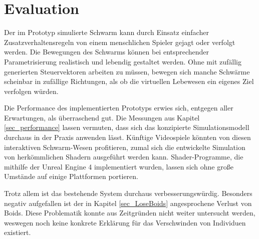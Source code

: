 \documentclass[a4paper, 10pt, journal]{wissarbIEEE}      %
\begin{document}
\section{Evaluation}



Der im Prototyp simulierte Schwarm kann durch Einsatz einfacher Zusatzverhaltensregeln von einem menschlichen Spieler gejagt oder verfolgt werden. 
Die Bewegungen des Schwarms können bei entsprechender Parametrisierung realistisch und lebendig gestaltet werden. Ohne mit zufällig generierten Steuervektoren arbeiten zu müssen, bewegen sich manche Schwärme scheinbar in zufällige Richtungen, als ob die virtuellen Lebewesen ein eigenes Ziel verfolgen würden.

Die Performance des implementierten Prototyps erwies sich, entgegen aller Erwartungen, als überraschend gut. Die Messungen aus Kapitel \ref{sec_performance} lassen vermuten, dass sich das konzipierte Simulationsmodell durchaus in der Praxis anwenden lässt. Künftige Videospiele könnten von diesen interaktiven Schwarm-Wesen profitieren, zumal sich die entwickelte Simulation von herkömmlichen Shadern ausgeführt werden kann. Shader-Programme, die mithilfe der Unreal Engine 4 implementiert wurden, lassen sich ohne große Umstände auf einige Plattformen portieren. 





Trotz allem ist das bestehende System durchaus verbesserungswürdig. Besonders negativ aufgefallen ist der in Kapitel \ref{sec_LoseBoids} angesprochene Verlust von Boids. Diese Problematik konnte aus Zeitgründen nicht weiter untersucht werden, weswegen noch keine konkrete Erklärung für das Verschwinden von Individuen existiert.
\end{document}
